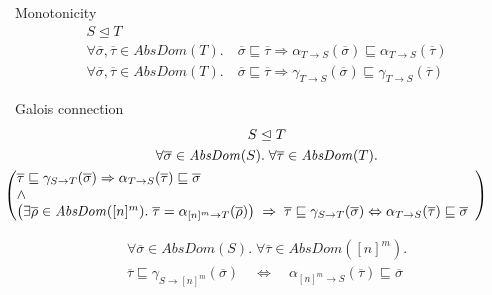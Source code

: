 \documentclass[11pt,svgnames,smaller,aspectratio=43,english]{beamer}
\renewcommand{\implies}{\Rightarrow}
\renewcommand{\iff}{\Leftrightarrow}
\begin{document}
\begin{frame}{Monotonicity}
	\begin{gather*}
		S \trianglelefteq T\\
		\forall \overline{\sigma}, \overline{\tau} \in \mathit{AbsDom}(T).\quad \overline{\sigma} \sqsubseteq \overline{\tau} \implies \alpha_{T\rightarrow S}(\overline{\sigma})\sqsubseteq\alpha_{T\rightarrow S}(\overline{\tau})\\
		\forall \overline{\sigma}, \overline{\tau} \in \mathit{AbsDom}(T).\quad \overline{\sigma} \sqsubseteq \overline{\tau} \implies \gamma_{T\rightarrow S}(\overline{\sigma})\sqsubseteq\gamma_{T\rightarrow S}(\overline{\tau})
	\end{gather*}
\end{frame}

\begin{frame}{Galois connection}
	\begin{gather*}
		S \trianglelefteq T\\
		\forall \overline{\sigma}\in \mathit{AbsDom}(S).\; \forall \overline{\tau}\in \mathit{AbsDom}(T).\\
		\hspace*{-3em}
		\left(\begin{array}{@{}ll@{}@{}}
			\overline{\tau}\sqsubseteq \gamma_{S \rightarrow T}(\overline{\sigma}) \implies \alpha_{T\rightarrow S}(\overline{\tau})\sqsubseteq \overline{\sigma} \\
			\land\\
			\left(\exists \overline{\rho}\in\mathit{AbsDom}([n]^m).\;\overline{\tau} = \alpha_{[n]^m\rightarrow T}(\overline{\rho})\right) \;\implies\; \overline{\tau}\sqsubseteq \gamma_{S\rightarrow T}(\overline{\sigma}) \iff \alpha_{T\rightarrow S}(\overline{\tau}) \sqsubseteq \overline{\sigma} 
		  \end{array}\right)
	\end{gather*}

	\begin{gather*}
		\forall \overline{\sigma}\in \mathit{AbsDom}(S).\; \forall \overline{\tau}\in \mathit{AbsDom}([n]^m).\\
		\overline{\tau} \sqsubseteq \gamma_{S\rightarrow [n]^m}(\overline{\sigma}) \quad\iff\quad \alpha_{[n]^m \rightarrow S}(\overline{\tau}) \sqsubseteq \overline{\sigma}
	\end{gather*}
\end{frame}
\end{document}
